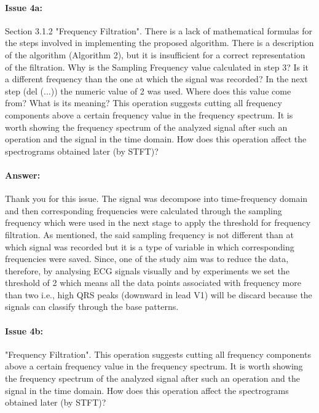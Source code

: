 \documentclass{article}
\begin{document}
\paragraph{Issue 4a:}
\begin{displayquote}
Section 3.1.2 "Frequency Filtration". There is a lack of mathematical formulas for the steps involved in implementing the proposed algorithm. There is a description of the algorithm (Algorithm 2), but it is insufficient for a correct representation of the filtration. Why is the Sampling Frequency  value calculated in step 3? Is it a different frequency than the one at which the signal was recorded? In the next step (del (...)) the numeric value of 2 was used. Where does this value come from? What is its meaning? This operation suggests cutting all frequency components above a certain frequency value in the frequency spectrum. It is worth showing the frequency spectrum of the analyzed signal after such an operation and the signal in the time domain. How does this operation affect the spectrograms obtained later (by STFT)? 
\end{displayquote}

\paragraph{Answer:}
Thank you for this issue. The signal was decompose into time-frequency domain and then corresponding frequencies were calculated through the sampling frequency  which were used in the next stage to apply the threshold for frequency filtration.  As mentioned, the said sampling frequency is not different than at which signal was recorded but it is a type of variable in which corresponding frequencies were saved. Since, one of the study aim was to reduce the data, therefore, by analysing ECG signals visually and by experiments we set the threshold of 2 which means all the data points associated with frequency more than two i.e., high QRS peaks (downward in lead V1) will be discard because the signals can classify through the base patterns. 

\paragraph{Issue 4b:}
\begin{displayquote}
"Frequency Filtration". This operation suggests cutting all frequency components above a certain frequency value in the frequency spectrum. It is worth showing the frequency spectrum of the analyzed signal after such an operation and the signal in the time domain. How does this operation affect the spectrograms obtained later (by STFT)?
\end{displayquote}
\end{document}
